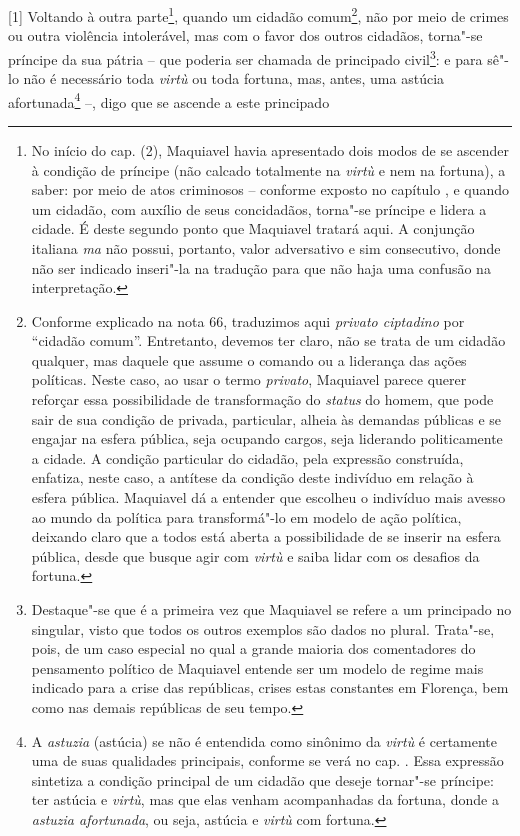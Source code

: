 {[}1{]} Voltando à outra parte\footnote{No início do cap.  (2),
  Maquiavel havia apresentado dois modos de se ascender à condição de
  príncipe (não calcado totalmente na \emph{virtù} e nem na fortuna), a
  saber: por meio de atos criminosos -- conforme exposto no capítulo
  , e quando um cidadão, com auxílio de seus concidadãos, torna"-se
  príncipe e lidera a cidade. É deste segundo ponto que Maquiavel
  tratará aqui. A conjunção italiana \emph{ma} não possui, portanto,
  valor adversativo e sim consecutivo, donde não ser indicado inseri"-la
  na tradução para que não haja uma confusão na interpretação.}, quando
um cidadão comum\footnote{Conforme explicado na nota 66, traduzimos aqui
  \emph{privato ciptadino} por ``cidadão comum''. Entretanto, devemos
  ter claro, não se trata de um cidadão qualquer, mas daquele que assume
  o comando ou a liderança das ações políticas. Neste caso, ao usar o
  termo \emph{privato}, Maquiavel parece querer reforçar essa
  possibilidade de transformação do \emph{status} do homem, que pode
  sair de sua condição de privada, particular, alheia às demandas
  públicas e se engajar na esfera pública, seja ocupando cargos, seja
  liderando politicamente a cidade. A condição particular do cidadão,
  pela expressão construída, enfatiza, neste caso, a antítese da
  condição deste indivíduo em relação à esfera pública. Maquiavel dá a
  entender que escolheu o indivíduo mais avesso ao mundo da política
  para transformá"-lo em modelo de ação política, deixando claro que a
  todos está aberta a possibilidade de se inserir na esfera pública,
  desde que busque agir com \emph{virtù} e saiba lidar com os desafios
  da fortuna.}, não por meio de crimes ou outra violência intolerável,
mas com o favor dos outros cidadãos, torna"-se príncipe da sua pátria --
que poderia ser chamada de principado civil\footnote{Destaque"-se que é a
  primeira vez que Maquiavel se refere a um principado no singular,
  visto que todos os outros exemplos são dados no plural. Trata"-se,
  pois, de um caso especial no qual a grande maioria dos comentadores do
  pensamento político de Maquiavel entende ser um modelo de regime mais
  indicado para a crise das repúblicas, crises estas constantes em
  Florença, bem como nas demais repúblicas de seu tempo.}: e para sê"-lo
não é necessário toda \emph{virtù} ou toda fortuna, mas, antes, uma
astúcia afortunada\footnote{A \emph{astuzia} (astúcia) se não é
  entendida como sinônimo da \emph{virtù} é certamente uma de suas
  qualidades principais, conforme se verá no cap. . Essa expressão
  sintetiza a condição principal de um cidadão que deseje tornar"-se
  príncipe: ter astúcia e \emph{virtù}, mas que elas venham acompanhadas
  da fortuna, donde a \emph{astuzia afortunada}, ou seja, astúcia e
  \emph{virtù} com fortuna.} --, digo que se ascende a este principado
